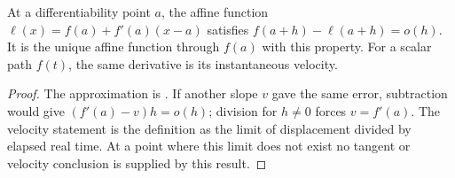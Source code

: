 \begin{proposition}
At a differentiability point $a$, the affine function $\ell(x)=f(a)+f'(a)(x-a)$ satisfies $f(a+h)-\ell(a+h)=o(h)$. It is the unique affine function through $f(a)$ with this property. For a scalar path $f(t)$, the same derivative is its instantaneous velocity.
\end{proposition}
\begin{proof}
The approximation is . If another slope $v$ gave the same error, subtraction would give $(f'(a)-v)h=o(h)$; division for $h\ne0$ forces $v=f'(a)$. The velocity statement is the definition as the limit of displacement divided by elapsed real time. At a point where this limit does not exist no tangent or velocity conclusion is supplied by this result.
\end{proof}
